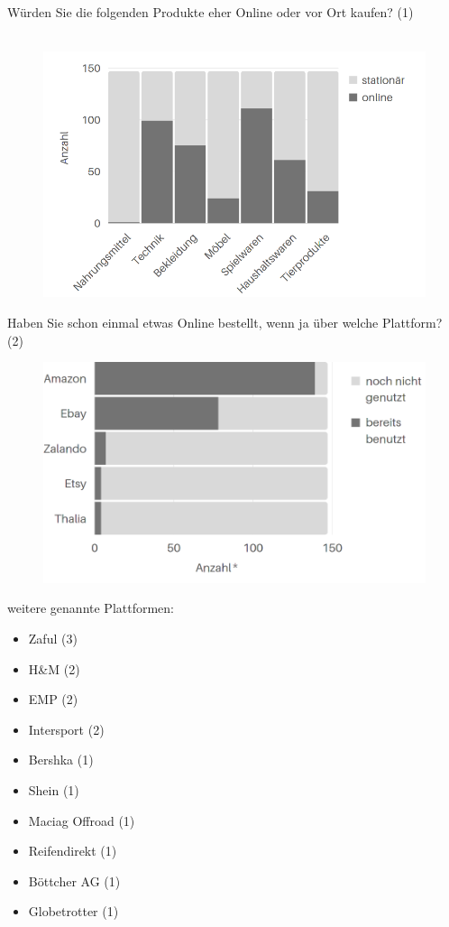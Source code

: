\documentclass[a4paper, 12pt]{scrartcl}
\begin{document}
Würden Sie die folgenden Produkte eher Online oder vor Ort kaufen? (1)\\\\
\begin{figure}[H]
    \begin{center}
        \includegraphics[width=12.5cm]{media/schuelerumfrage/1.png}
    \end{center}
\end{figure} 



\newpage\noindent Haben Sie schon einmal etwas Online bestellt, wenn ja über welche Plattform? (2)\\
\begin{figure}[H]
    \begin{center}
        \includegraphics[width=11.5cm]{media/schuelerumfrage/2.png} 
    \end{center}
\end{figure}

\noindent weitere genannte Plattformen:
\begin{itemize}
 \item Zaful (3)
 \item H\&M (2)
 \item EMP (2)
 \item Intersport (2)
 \item Bershka (1)
 \item Shein (1)
 \item Maciag Offroad (1)
 \item Reifendirekt (1)
 \item Böttcher AG (1)
 \item Globetrotter (1)
\end{itemize}
\end{document}
